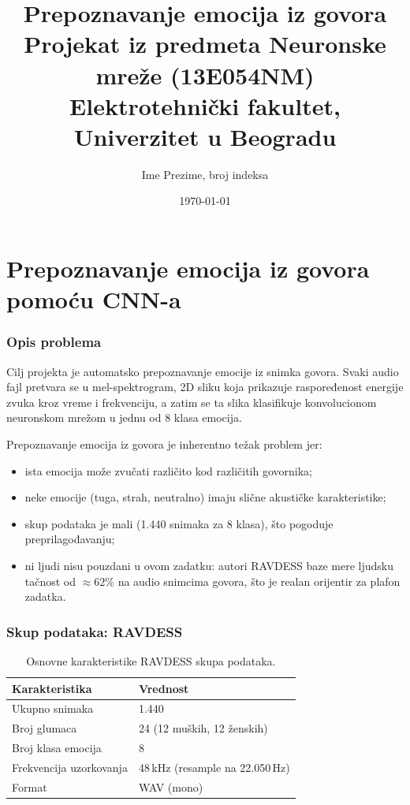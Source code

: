 \documentclass[12pt,a4paper]{article}
\title{Prepoznavanje emocija iz govora\\
       \large Projekat iz predmeta Neuronske mreže (13E054NM)\\
       Elektrotehnički fakultet, Univerzitet u Beogradu}
\author{Ime Prezime, broj indeksa}
\date{\today}
\begin{document}
\maketitle
\tableofcontents
\newpage

\part{Prepoznavanje emocija iz govora pomoću CNN-a}

\section{Opis problema}

Cilj projekta je automatsko prepoznavanje emocije iz snimka govora. Svaki
audio fajl pretvara se u mel-spektrogram, 2D sliku koja prikazuje
raspoređenost energije zvuka kroz vreme i frekvenciju, a zatim se ta slika
klasifikuje konvolucionom neuronskom mrežom u jednu od 8 klasa emocija.

Prepoznavanje emocija iz govora je inherentno težak problem jer:
\begin{itemize}
  \item ista emocija može zvučati različito kod različitih govornika;
  \item neke emocije (tuga, strah, neutralno) imaju slične akustičke
        karakteristike;
  \item skup podataka je mali (1.440 snimaka za 8 klasa), što pogoduje
        preprilagođavanju;
  \item ni ljudi nisu pouzdani u ovom zadatku: autori RAVDESS baze mere
        ljudsku tačnost od $\approx 62\%$ na audio snimcima govora, što je
        realan orijentir za plafon zadatka.
\end{itemize}

\section{Skup podataka: RAVDESS}

\begin{table}[H]
\centering
\begin{tabular}{ll}
\toprule
Karakteristika & Vrednost \\
\midrule
Ukupno snimaka           & 1.440 \\
Broj glumaca             & 24 (12 muških, 12 ženskih) \\
Broj klasa emocija       & 8 \\
Frekvencija uzorkovanja  & 48\,kHz (resample na 22.050\,Hz) \\
Format                   & WAV (mono) \\
\bottomrule
\end{tabular}
\caption{Osnovne karakteristike RAVDESS skupa podataka.}
\end{table}
\end{document}
